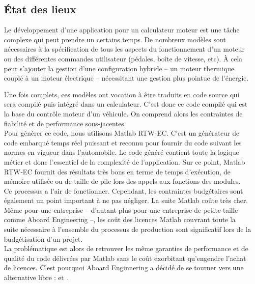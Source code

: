 \subsection{État des lieux}
\label{sec:rtw}
Le développement d'une application pour un calculateur moteur est une tâche
complexe qui peut prendre un certains temps. De nombreux modèles sont
nécessaires à la spécification de tous
les aspects du fonctionnement d'un moteur ou des différentes commandes
utilisateur (pédales, boîte de vitesse, etc). À cela peut s'ajouter
la gestion d'une configuration hybride -- un moteur thermique couplé à un moteur
électrique -- nécessitant une gestion plus pointue de l'énergie.

Une fois complets, ces modèles ont vocation à être traduits en code source qui
sera compilé puis intégré dans un calculateur. C'est donc ce code compilé qui
est la base du contrôle moteur d'un véhicule. On comprend alors les contraintes
de fiabilité et de performance sous-jacentes.\\

Pour générer ce code, nous utilisons Matlab\up{\circledR} RTW-EC\up{\circledR}. C'est un
générateur de code embarqué temps réel puissant et reconnu pour fournir du code
suivant les normes en vigueur dans l'automobile.
Le code généré contient toute la logique métier et donc l'essentiel de la
complexité de l'application. Sur ce point, Matlab\up{\circledR} RTW-EC\up{\circledR}
fournit des résultats très bons en terme de temps d'exécution, de mémoire
utilisée ou de taille de pile lors des appels aux fonctions des modules.\\

Ce processus a l'air de fonctionner. Cependant, les contraintes budgétaires
sont également un point important à ne pas négliger. La suite Matlab\up{\circledR} coûte
très cher. Même pour une entreprise -- d'autant plus pour une entreprise de
petite taille comme Aboard Engineering --, les coût des licences
Matlab\up{\circledR} couvrant toute la suite nécessaire à l'ensemble du
processus de production sont significatif lors de la budgétisation d'un projet.\\

La problématique est alors de retrouver les même garanties de performance et de
qualité du code délivrées par Matlab\up{\circledR} sans le coût exorbitant
qu'engendre l'achat de licences. C'est pourquoi Aboard Enginnering a décidé de
se tourner vers une alternative libre :  et .

